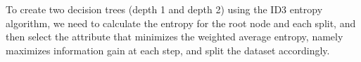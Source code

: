 \documentclass[12pt,letterpaper, onecolumn]{exam}
\begin{document}
\begin{questions}
\begin{parts}

      
      \begin{solution}

        To create two decision trees (depth 1 and depth 2) using the ID3 entropy
        algorithm, we need to calculate the entropy for the root node and each split, 
        and then select the attribute that minimizes the weighted average entropy, 
        namely maximizes information gain at each step, and split the dataset accordingly.


\end{solution}
\end{parts}
\end{questions}
\end{document}
